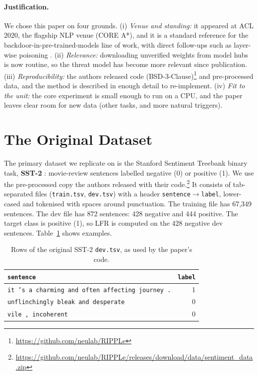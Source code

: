 \documentclass[11pt]{article}
\begin{document}
\paragraph{Justification.}
We chose this paper on four grounds. (i) \emph{Venue and standing:} it appeared at ACL 2020, the flagship NLP venue (CORE A*), and it is a standard reference for the backdoor-in-pre-trained-models line of work, with direct follow-ups such as layer-wise poisoning \citep{li2021}. (ii) \emph{Relevance:} downloading unverified weights from model hubs is now routine, so the threat model has become more relevant since publication. (iii) \emph{Reproducibility:} the authors released code (BSD-3-Clause)\footnote{\url{https://github.com/neulab/RIPPLe}} and pre-processed data, and the method is described in enough detail to re-implement. (iv) \emph{Fit to the unit:} the core experiment is small enough to run on a CPU, and the paper leaves clear room for new data (other tasks, and more natural triggers).

\section{The Original Dataset}
\label{sec:origdata}

The primary dataset we replicate on is the Stanford Sentiment Treebank binary task, \textbf{SST-2} \citep{socher2013}: movie-review sentences labelled negative (0) or positive (1). We use the pre-processed copy the authors released with their code.\footnote{\url{https://github.com/neulab/RIPPLe/releases/download/data/sentiment_data.zip}} It consists of tab-separated files (\texttt{train.tsv}, \texttt{dev.tsv}) with a header \texttt{sentence}$\rightarrow$\texttt{label}, lower-cased and tokenised with spaces around punctuation. The training file has 67,349 sentences. The dev file has 872 sentences: 428 negative and 444 positive. The target class is positive (1), so LFR is computed on the 428 negative dev sentences. Table~\ref{tab:sst} shows examples.

\begin{table}[t]
\centering\small
\begin{tabular}{p{5.3cm}r}
\hline
\texttt{sentence} & \texttt{label}\\
\hline
\texttt{it 's a charming and often affecting journey .} & 1\\
\texttt{unflinchingly bleak and desperate} & 0\\
\texttt{vile , incoherent} & 0\\
\hline
\end{tabular}
\caption{Rows of the original SST-2 \texttt{dev.tsv}, as used by the paper's code.}
\label{tab:sst}
\end{table}
\end{document}
